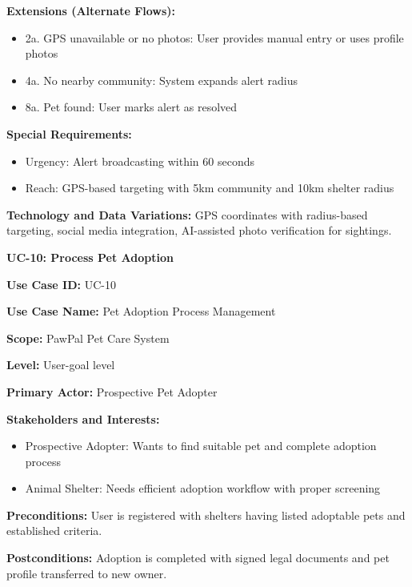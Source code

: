 \textbf{Extensions (Alternate Flows):}
\begin{itemize}
    \item 2a. GPS unavailable or no photos: User provides manual entry or uses profile photos
    \item 4a. No nearby community: System expands alert radius
    \item 8a. Pet found: User marks alert as resolved
\end{itemize}

\textbf{Special Requirements:}
\begin{itemize}
    \item Urgency: Alert broadcasting within 60 seconds
    \item Reach: GPS-based targeting with 5km community and 10km shelter radius
\end{itemize}

\textbf{Technology and Data Variations:} GPS coordinates with radius-based targeting, social media integration, AI-assisted photo verification for sightings.

\textbf{UC-10: Process Pet Adoption}

\textbf{Use Case ID:} UC-10

\textbf{Use Case Name:} Pet Adoption Process Management

\textbf{Scope:} PawPal Pet Care System

\textbf{Level:} User-goal level

\textbf{Primary Actor:} Prospective Pet Adopter

\textbf{Stakeholders and Interests:}
\begin{itemize}
    \item Prospective Adopter: Wants to find suitable pet and complete adoption process
    \item Animal Shelter: Needs efficient adoption workflow with proper screening
\end{itemize}

\textbf{Preconditions:} User is registered with shelters having listed adoptable pets and established criteria.

\textbf{Postconditions:} Adoption is completed with signed legal documents and pet profile transferred to new owner.

